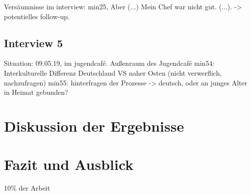 \documentclass[12pt,oneside]{article}
\begin{document}
Versäumnisse im interview: min25, Aber (...) Mein Chef war nicht gut. (...).
                -> potentielles follow-up.

\subsection{Interview 5}
Situation: 09.05.19, im jugendcafé. Außenraum des Jugendcafé
min54:      Interkulturelle Differenz Deutschland VS naher Osten (nicht verwerflich, nachzufragen)
min55:      hinterfragen der Prozesse -> deutsch, oder an junges Alter in Heimat gebunden?

\section{Diskussion der Ergebnisse}

\section{Fazit und Ausblick}

10\% der Arbeit

\clearpage
\lhead{}
\printbibliography
{}


\end{document}
